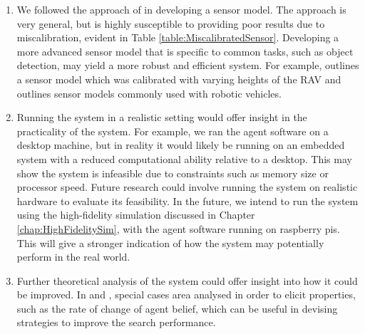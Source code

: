\begin{enumerate}
    \item  We followed the approach of \cite{Chung2007ASearch} in developing a sensor model. The approach is very general, but is highly susceptible to providing poor results due to miscalibration, evident in Table \ref{table:MiscalibratedSensor}. Developing a more advanced sensor model that is specific to common tasks, such as object detection, may yield a more robust and efficient system. For example, \cite{Symington2010ProbabilisticUAVs} outlines a sensor model which was calibrated with varying heights of the RAV and \cite{Thrun:2005:ProbabilisticRobotics} outlines sensor models commonly used with robotic vehicles.
    \item Running the system in a realistic setting would offer insight in the practicality of the system. For example, we ran the agent software on a desktop machine, but in reality it would likely be running on an embedded system with a reduced computational ability relative to a desktop. This may show the system is infeasible due to constraints such as memory size or processor speed. Future research could involve running the system on realistic hardware to evaluate its feasibility. In the future, we intend to run the system using the high-fidelity simulation discussed in Chapter \ref{chap:HighFidelitySim}, with the agent software running on raspberry pis. This will give a stronger indication of how the system may potentially perform in the real world.
    \item Further theoretical analysis of the system could offer insight into how it could be improved. In \cite{Chung2012AnalysisStrategies} and \cite{Chung2009ProbabilisticAgents}, special cases area analysed in order to elicit properties, such as the rate of change of agent belief, which can be useful in devising strategies to improve the search performance.
\end{enumerate}